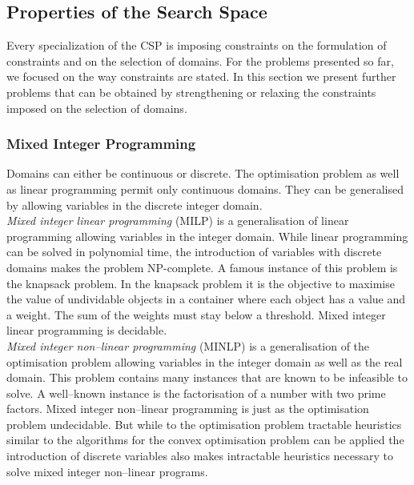 \subsection{Properties of the Search Space}
\label{sec:MathSearchSpaceProperties}
Every specialization of the CSP is imposing constraints on the formulation of constraints and on the selection of domains. For the problems presented so far, we focused on the way constraints are stated. In this section we present further problems that can be obtained by strengthening or relaxing the constraints imposed on the selection of domains.
\subsubsection{Mixed Integer Programming}
Domains can either be continuous or discrete. The optimisation problem as well as linear programming permit only continuous domains. They can be generalised by allowing variables in the discrete integer domain.\\
\emph{Mixed integer linear programming} (MILP) is a generalisation of linear programming allowing variables in the integer domain. While linear programming can be solved in polynomial time, the introduction of variables with discrete domains makes the problem NP-complete. A famous instance of this problem is the knapsack problem. In the knapsack problem it is the objective to maximise the value of undividable objects in a container where each object has a value and a weight. The sum of the weights must stay below a threshold. Mixed integer linear programming is decidable.\\
\emph{Mixed integer non--linear programming} (MINLP) is a generalisation of the optimisation problem allowing variables in the integer domain as well as the real domain. This problem contains many instances that are known to be infeasible to solve. A well--known instance is the factorisation of a number with two prime factors. Mixed integer non--linear programming is just as the optimisation problem undecidable. But while to the optimisation problem tractable heuristics similar to the algorithms for the convex optimisation problem can be applied the introduction of discrete variables also makes intractable heuristics necessary to solve mixed integer non--linear programs.


